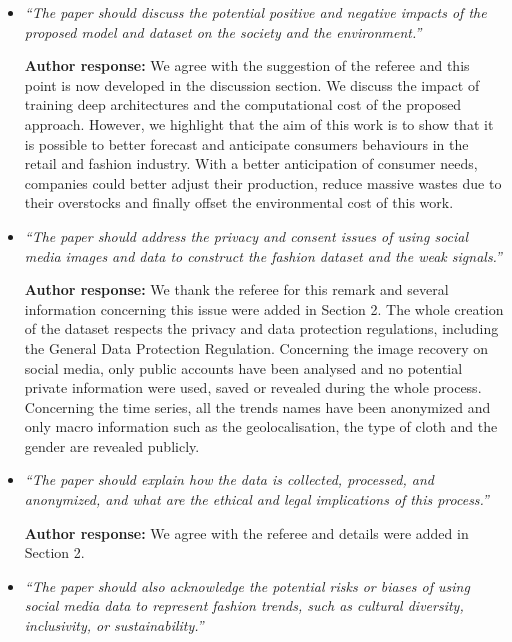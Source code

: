 \documentclass[10pt]{article} %
\begin{document}
\begin{itemize}
	\item {\em ``The paper should discuss the potential positive and negative impacts of the proposed model and dataset on the society and the environment.''} \medskip
	
	\textbf{Author response:} We agree with the suggestion of the referee and this point is now developed in the discussion section. We discuss the impact of training deep architectures and the computational cost of the proposed approach. However, we highlight that the aim of this work is to show that it is possible to better forecast and anticipate consumers behaviours in the retail and fashion industry. With a better anticipation of consumer needs, companies could better adjust their production, reduce massive wastes due to their overstocks and finally offset the environmental cost of this work.  \\
	
	\item {\em ``The paper should address the privacy and consent issues of using social media images and data to construct the fashion dataset and the weak signals.''} \medskip
	
	\textbf{Author response:} We thank the referee for this remark and several information concerning this issue were added in Section 2. The whole creation of the dataset respects the privacy and data protection regulations, including the General Data Protection Regulation. Concerning the image recovery on social media, only public accounts have been analysed and no potential private information were used, saved or revealed during the whole process. Concerning the time series, all the trends names have been anonymized and only macro information such as the geolocalisation, the type of cloth and the gender are revealed publicly. \\
	
	\item {\em ``The paper should explain how the data is collected, processed, and anonymized, and what are the ethical and legal implications of this process.''} \medskip
	
	\textbf{Author response:} We agree with the referee and  details were added  in  Section 2. \\
	
	\item {\em ``The paper should also acknowledge the potential risks or biases of using social media data to represent fashion trends, such as cultural diversity, inclusivity, or sustainability.''} \medskip
	

\end{itemize}
\end{document}
